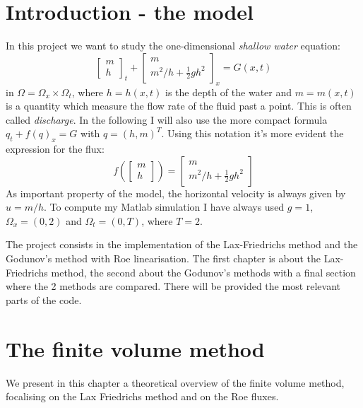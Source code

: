 \documentclass[oneside,12pt]{book}  %
\theoremstyle{plain}
\theoremstyle{definition}
\theoremstyle{remark}
\numberwithin{equation}{chapter} %
\begin{document}

\chapter*{Introduction - the model} %


In this project we want to study the one-dimensional \textit{shallow
  water} equation:
\begin{equation}
  \label{eq:shallow_water}
  \begin{bmatrix} m \\ h \end{bmatrix}_t +\begin{bmatrix} m \\
    m^2/h+\frac{1}{2}gh^2 \end{bmatrix}_x = G(x,t)
\end{equation}
in $\Omega=\Omega_x \times  \Omega_t$, where $h=h(x,t)$ is the depth
of the water and $m=m(x,t)$ is a quantity which measure the flow rate
of the fluid past a point. This is often called \textit{discharge}.
In the following I will also use the more compact formula
$q_t+f(q)_x=G$ with $q=(h,m)^T$. Using this notation it's more evident
the expression for the flux:
\begin{equation}
  \label{eq:flux}
  f\left (\begin{bmatrix} m \\ h \end{bmatrix}\right ) =\begin{bmatrix} m \\
    m^2/h+\frac{1}{2}gh^2 \end{bmatrix}
\end{equation}
As important property of the model, the horizontal velocity is always
given by $u=m/h$.
To compute my Matlab simulation I have always used
$g=1$, $\Omega_x=(0,2)$ and $\Omega_t=(0,T)$, where $T=2$.

The project consists in the implementation of the Lax-Friedrichs
method and the Godunov's method with Roe linearisation. The first
chapter is about the Lax-Friedrichs method, the second about the
Godunov's methods with a final section where the 2 methods are
compared. There will be provided the most relevant parts of the code.




\chapter{The finite volume method}
We present in this chapter a theoretical overview of the finite volume
method, focalising on the Lax Friedrichs method and on the Roe
fluxes. 
\end{document}

